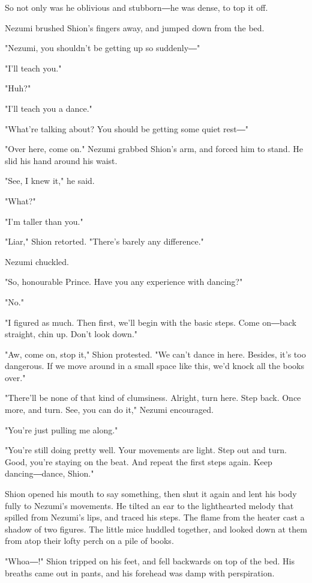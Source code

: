 So not only was he oblivious and stubborn―he was dense, to top it off.

Nezumi brushed Shion's fingers away, and jumped down from the bed.

"Nezumi, you shouldn't be getting up so suddenly―"

"I'll teach you."

"Huh?"

"I'll teach you a dance."

"What're talking about? You should be getting some quiet rest―"

"Over here, come on." Nezumi grabbed Shion's arm, and forced him to
stand. He slid his hand around his waist.

"See, I knew it," he said.

"What?"

"I'm taller than you."

"Liar," Shion retorted. "There's barely any difference."

Nezumi chuckled.

"So, honourable Prince. Have you any experience with dancing?"

"No."

"I figured as much. Then first, we'll begin with the basic steps. Come
on―back straight, chin up. Don't look down."

"Aw, come on, stop it," Shion protested. "We can't dance in here.
Besides, it's too dangerous. If we move around in a small space like
this, we'd knock all the books over."

"There'll be none of that kind of clumsiness. Alright, turn here. Step
back. Once more, and turn. See, you can do it," Nezumi encouraged.

"You're just pulling me along."

"You're still doing pretty well. Your movements are light. Step out and
turn. Good, you're staying on the beat. And repeat the first steps
again. Keep dancing―dance, Shion."

Shion opened his mouth to say something, then shut it again and lent his
body fully to Nezumi's movements. He tilted an ear to the lighthearted
melody that spilled from Nezumi's lips, and traced his steps. The flame
from the heater cast a shadow of two figures. The little mice huddled
together, and looked down at them from atop their lofty perch on a pile
of books.

"Whoa―!" Shion tripped on his feet, and fell backwards on top of the
bed. His breaths came out in pants, and his forehead was damp with
perspiration.


